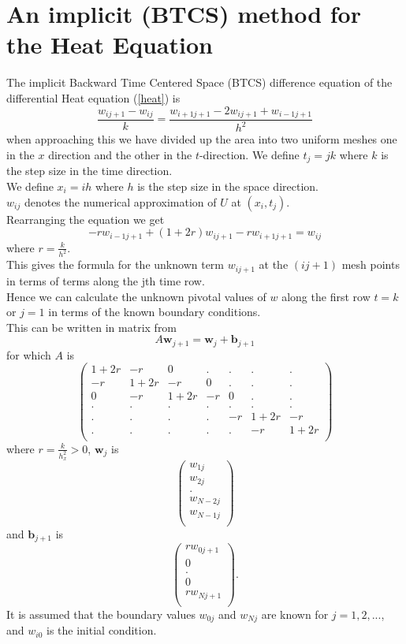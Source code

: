 \section{An implicit (BTCS) method for the Heat Equation}
The  implicit Backward Time Centered Space (BTCS) difference equation of the differential Heat equation (\ref{heat}) is
\begin{equation}
\frac{w_{ij+1}-w_{ij}}{k}=\frac{w_{i+1j+1}-2w_{ij+1}+w_{i-1j+1}}{h^2}
\end{equation}
when approaching this we have divided up the area into
two uniform meshes one in the $x$ direction and the other in the $t$-direction.
We define $t_j=jk$ where $k$ is the step size in the time direction.\\
We define $x_i=ih$ where $h$ is the step size in the space direction.\\
$w_{ij}$ denotes the numerical approximation of $U$ at $(x_i,t_j)$.\\
Rearranging the equation we get
\begin{equation}\label{disc heat imp}
-rw_{i-1j+1}+(1+2r)w_{ij+1}-rw_{i+1j+1}=w_{ij}
\end{equation}
where $r=\frac{k}{h^2}$.\\
This gives the formula for the unknown term $w_{ij+1}$ at the $(ij+1)$ mesh points
in terms of terms along the jth time row.\\
Hence we can calculate the unknown pivotal values of $w$ along the first row $t=k$ or $j=1$ in terms of the known boundary conditions.\\
This can be written in matrix from 
\[ A\mathbf{w}_{j+1}=\mathbf{w}_{j} +\mathbf{b}_{j+1} \]
for which $A$ is
\[
\left(\begin{array}{ccccccc}
1+2r&-r&0&.&.&.&.\\
-r&1+2r&-r&0&.&.&.\\
0&-r&1+2r&-r&0&.&.\\
.&.&.&.&.&.&.\\
.&.&.&.&-r&1+2r&-r\\
.&.&.&.&.&-r&1+2r\\
\end{array}\right)
\]
where $r=\frac{k}{h_x^2}>0$, $\mathbf{w}_j$ is 
\[
\left(\begin{array}{c}
w_{1j}\\
w_{2j}\\
.\\
w_{N-2j}\\
w_{N-1j}\\

\end{array}\right)
\]
and $\mathbf{b}_{j+1}$ is 
\[
\left(\begin{array}{c}
rw_{0j+1}\\
0\\
.\\
0\\
rw_{Nj+1}\\
\end{array}\right).
\]
It is assumed that the boundary values $w_{0j}$ and $w_{Nj}$ are known for $j=1,2,...$, and $w_{i0}$ is the initial condition.

